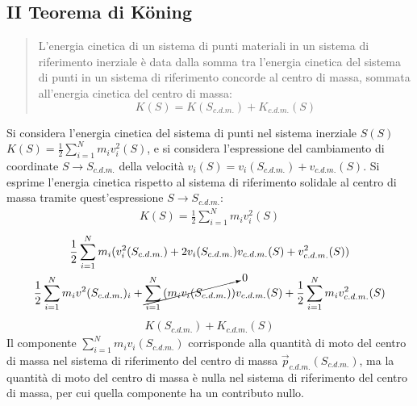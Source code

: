 \documentclass{article}
\numberwithin{equation}{subsection}
\begin{document}
\subsection{II Teorema di K\"{o}ning}
\begin{quotation}
    L'energia cinetica di un sistema di punti materiali in un 
    sistema di riferimento inerziale è data dalla somma tra 
    l'energia cinetica del sistema di punti in un sistema di 
    riferimento concorde al centro di massa, sommata all'energia 
    cinetica del centro di massa:
    \begin{equation}
        K(S)=K(S_{c.d.m.})+K_{c.d.m.}(S)
    \end{equation}
\end{quotation}

Si considera l'energia cinetica del sistema di punti nel sistema inerziale $S(S)$ \\
$K(S)=\displaystyle\frac{1}{2}\sum_{i=1}^{N}m_iv_i^{2}(S)$, e 
si considera l'espressione del cambiamento di coordinate $S\to S_{c.d.m.}$ della velocità $v_i(S)=v_i(S_{c.d.m.})+v_{c.d.m.}(S)$. Si esprime l'energia cinetica 
rispetto al sistema di riferimento solidale al centro di massa tramite quest'espressione $S\to S_{c.d.m.}$: 
\begin{gather*}
    K(S)=\displaystyle\frac{1}{2}\sum_{i=1}^{N}m_iv_i^{2}(S)
\end{gather*}
\begin{gather*}
    \displaystyle\frac{1}{2}\sum_{i=1}^{N}m_i(v^{2}_i(S_{c.d.m.})+2v_i(S_{c.d.m.}){v}_{c.d.m.}(S)+v_{c.d.m.}^{2}(S))\\
    \displaystyle\frac{1}{2}\displaystyle\sum_{i=1}^{N}m_iv^{2}(S_{c.d.m.})_i+\cancelto{0}{\displaystyle\sum_{i=1}^{N}\left(m_i{v}_i(S_{c.d.m.})\right)}{v}_{c.d.m.}(S)+\frac{1}{2}\displaystyle\sum_{i=1}^{N}m_iv_{c.d.m.}^{2}(S)
\end{gather*}
\begin{gather*}
    K(S_{c.d.m.})+K_{c.d.m.}(S)
\end{gather*}
Il componente $\displaystyle\sum_{i=1}^{N}m_i{v}_i(S_{c.d.m.})$ corrisponde alla quantità di moto del centro di massa nel sistema di riferimento del centro di massa $\vec{p}_{c.d.m.}(S_{c.d.m.})$, 
ma la quantità di moto del centro di massa è nulla nel sistema di riferimento del centro di massa, per cui quella componente ha un contributo nullo. 
\end{document}

